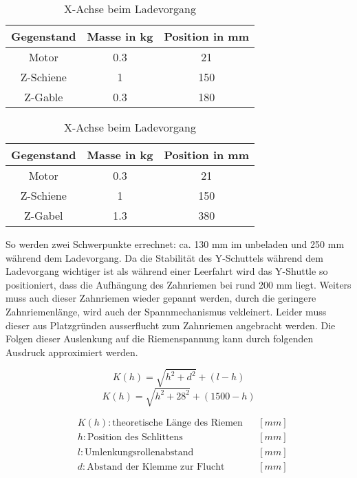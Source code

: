 \begin{table}[H]
    \centering
    \centering
        \begin{tabular}{c c c}
            Gegenstand & Masse in kg & Position in mm\\
            \hline
            Motor & 0.3 & 21 \\
            Z-Schiene & 1 & 150 \\
            Z-Gable & 0.3 & 180 
        \end{tabular}
    \caption{X-Achse unbeladen und eingefahren}
        \vspace{5mm}
        \centering
        \begin{tabular}{c c c}
            Gegenstand & Masse in kg & Position in mm\\ 
            \hline
            Motor & 0.3 & 21 \\
            Z-Schiene & 1 & 150 \\
            Z-Gabel & 1.3 & 380
        \end{tabular}
        \caption{X-Achse beim Ladevorgang}
\end{table}
So werden zwei Schwerpunkte errechnet: ca. 130 mm im unbeladen und 250 mm während dem Ladevorgang. Da die Stabilität des Y-Schuttels während dem Ladevorgang wichtiger ist als während einer Leerfahrt wird das Y-Shuttle so positioniert, dass die Aufhängung des Zahnriemen bei rund 200 mm liegt.
Weiters muss auch dieser Zahnriemen wieder gepannt werden, durch die geringere Zahnriemenlänge, wird auch der Spannmechanismus vekleinert.
Leider muss dieser aus Platzgründen ausserflucht zum Zahnriemen angebracht werden. Die Folgen dieser Auslenkung auf die Riemenspannung kann durch folgenden Ausdruck approximiert werden.
    
    \vspace{4mm}
    \noindent\begin{minipage}{\textwidth}
    \begin{minipage}[t]{0.5\textwidth}
        \begin{equation*}
            K(h) = \sqrt{h^2+d^2}+(l-h)
        \end{equation*}
        \begin{equation*}
            K(h) = \sqrt{h^2+28^2}+(1500-h)
        \end{equation*}
    \end{minipage}%
    \begin{minipage}[t]{0.5\textwidth}
        \vspace{-7mm}
        \begin{align*}
            &K(h): \text{theoretische Länge des Riemen} & &\left[mm\right]\\
            &h: \text{Position des Schlittens} & &\left[mm\right]\\
            &l: \text{Umlenkungsrollenabstand} & &\left[mm\right]\\
            &d: \text{Abstand der Klemme zur Flucht} & &\left[mm\right]
        \end{align*}
    \end{minipage}
    \end{minipage}

